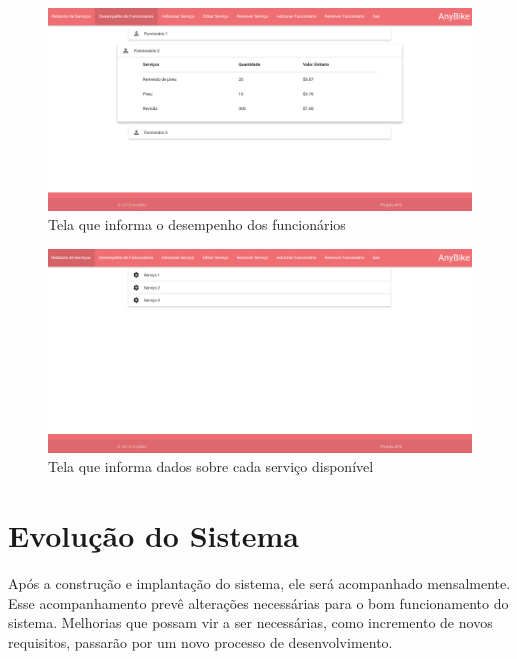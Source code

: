 \documentclass[
	12pt,				%
	openright,
	oneside,			%
	a4paper,			%
	chapter=TITLE,		%
	brazil				%
	]{abntex2}
\begin{document}
\begin{figure}[htb]
	\caption{Tela que informa o desempenho dos funcionários}
	\begin{center}
	    \includegraphics[scale=0.3]{Arquivos/relatorio_funcionario}  %
	\end{center}
\end{figure}


\begin{figure}[htb]
	\caption{Tela que informa dados sobre cada serviço disponível}
	\begin{center}
	    \includegraphics[scale=0.3]{Arquivos/relatorio_servico}  %
	\end{center}
\end{figure}





\newpage
\chapter{Evolução do Sistema}

Após a construção e implantação do sistema, ele será acompanhado mensalmente. Esse acompanhamento prevê alterações necessárias para o bom funcionamento do sistema. Melhorias que possam vir a ser necessárias, como incremento de novos requisitos, passarão por um novo processo de desenvolvimento.
  
\end{document}
